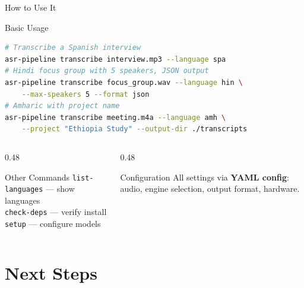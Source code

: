 \documentclass[aspectratio=169, 11pt]{beamer}
\begin{document}
\begin{frame}[fragile]{How to Use It}
    \begin{block}{Basic Usage}
        \begin{lstlisting}[language=bash, basicstyle=\ttfamily\scriptsize]
# Transcribe a Spanish interview
asr-pipeline transcribe interview.mp3 --language spa
# Hindi focus group with 5 speakers, JSON output
asr-pipeline transcribe focus_group.wav --language hin \
    --max-speakers 5 --format json
# Amharic with project name
asr-pipeline transcribe meeting.m4a --language amh \
    --project "Ethiopia Study" --output-dir ./transcripts
        \end{lstlisting}
    \end{block}
    \vspace{-0.2em}
    \begin{columns}[T]
        \begin{column}{0.48\textwidth}
            \begin{exampleblock}{Other Commands}
                \scriptsize
                \texttt{list-languages} --- show languages\\
                \texttt{check-deps} --- verify install\\
                \texttt{setup} --- configure models
            \end{exampleblock}
        \end{column}
        \begin{column}{0.48\textwidth}
            \begin{exampleblock}{Configuration}
                \scriptsize
                All settings via \textbf{YAML config}: audio, engine selection, output format, hardware.
            \end{exampleblock}
        \end{column}
    \end{columns}
\end{frame}

\section{Next Steps}
\end{document}
